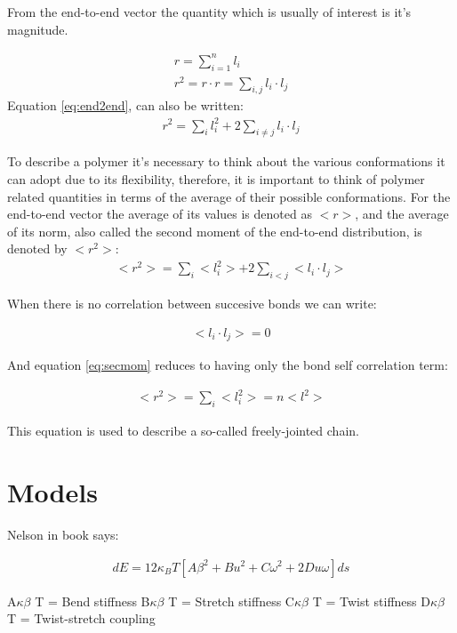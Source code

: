 From  the end-to-end  vector  the quantity
which is usually of interest is it's magnitude.

\begin{gather}
\label{eq:end2end}
r = \sum_{i=1}^{n} l_{i}\\
r^2 = r \cdot r = \sum_{i,j}l_{i} \cdot l_{j}
\end{gather}
Equation \ref{eq:end2end}, can also be written:
\begin{gather}
r^2 = \sum_{i}l_{i}^{2} + 2 \sum_{i\neq j} l_{i} \cdot l_{j}
\end{gather}  

To  describe a  polymer  it's  necessary to  think  about the  various
conformations it can adopt  due to its flexibility, therefore, it
is important  to think of polymer  related quantities in  terms of the
average of their possible conformations. For the end-to-end vector the
average of  its values  is denoted  as $<r>$, and  the average  of its
norm, also called the second moment of the end-to-end distribution, is
denoted by $<r^2>$:
\begin{gather}
\label{eq:secmom}  
<r^2>=\sum_{i}<l_{i}^2> + 2\sum_{i<j}<l_{i} \cdot l_{j}>
\end{gather}  

When there is no correlation between succesive bonds we can write:

\begin{gather}
\label{eq:nocorr}
<l_{i} \cdot l_{j}> = 0
\end{gather}

And equation \ref{eq:secmom} reduces to having only the bond self
correlation term:

\begin{gather}
<r^2> = \sum_{i}<l_{i}^2> = n<l^2>
\end{gather}  

This equation is used to describe a so-called freely-jointed chain.


\section{Models}

Nelson in book says:

\begin{gather}
dE={1}{2}\kappa_{B}T[A\beta^2+Bu^2+C\omega^2+2Du\omega]ds
\end{gather}  

A$\kappa \beta$ T = Bend stiffness
B$\kappa \beta$ T = Stretch stiffness
C$\kappa \beta$ T = Twist stiffness
D$\kappa \beta$ T = Twist-stretch coupling

